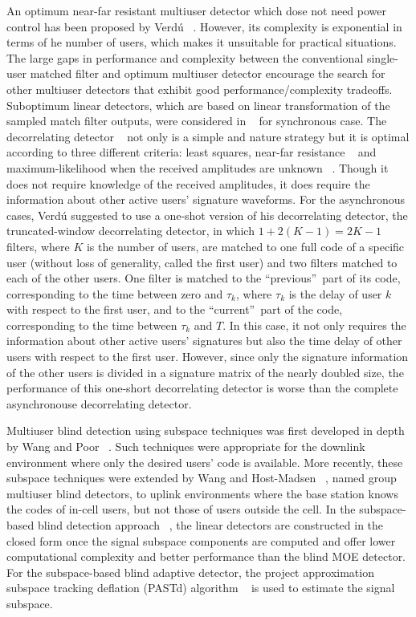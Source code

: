 \documentclass[a4paper,11pt,fleqn]{article}
\begin{document}
An optimum near-far resistant multiuser detector which dose not
need power control has been proposed by Verd\'u ~\cite{Verd89}.
However, its complexity is exponential in terms of he number of
users, which makes it unsuitable for practical situations. The
large gaps in performance and complexity between the conventional
single-user matched filter and optimum multiuser detector
encourage the search for other multiuser detectors that exhibit
good performance/complexity tradeoffs. Suboptimum linear
detectors, which are based on linear transformation of the sampled
match filter outputs, were considered in ~\cite{Lupa89} for
synchronous case. The decorrelating detector ~\cite{Lupa89} not
only is a simple and nature strategy but it is optimal according
to three different criteria: least squares, near-far resistance
~\cite{Verd86} and maximum-likelihood when the received amplitudes
are unknown ~\cite{Lupa89}. Though it does not require knowledge
of the received amplitudes, it does require the information about
other active users' signature waveforms. For the asynchronous
cases, Verd\'u suggested to use a one-shot version of his
decorrelating detector, the truncated-window decorrelating
detector, in which $1+2(K-1)=2K-1$ filters, where $K$ is the
number of users, are matched to one full code of a specific user
(without loss of generality, called the first user) and two
filters matched to each of the other users. One filter is matched
to the \textquotedblleft previous\textquotedblright\ part of its
code, corresponding to the time between zero and $\tau_k$, where
$\tau_k$ is the delay of user $k$ with respect to the first user,
and to the \textquotedblleft current\textquotedblright\ part of
the code, corresponding to the time between $\tau_k$ and $T$. In
this case, it not only requires the information about other active
users' signatures but also the time delay of other users with
respect to the first user. However, since only the signature
information of the other users is divided in a signature matrix of
the nearly doubled size, the performance of this one-short
decorrelating detector is worse than the complete asynchronouse
decorrelating detector.

Multiuser blind detection using subspace techniques was first
developed in depth by Wang and Poor ~\cite{Wang98, Poor98}. Such
techniques were appropriate for the downlink environment where
only the desired users' code is available. More recently, these
subspace techniques were extended by Wang and Host-Madsen
~\cite{Wang99}, named group multiuser blind detectors, to uplink
environments where the base station knows the codes of in-cell
users, but not those of users outside the cell. In the
subspace-based blind detection approach ~\cite{Wang98}, the linear
detectors are constructed in the closed form once the signal
subspace components are computed and offer lower computational
complexity and better performance than the blind MOE detector. For
the subspace-based blind adaptive detector, the project
approximation subspace tracking deflation (PASTd) algorithm
~\cite{Yang95} is used to estimate the signal subspace.
\end{document}
